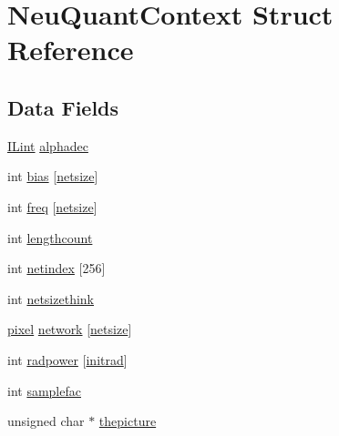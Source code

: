 \hypertarget{struct_neu_quant_context}{\section{Neu\-Quant\-Context Struct Reference}
\label{struct_neu_quant_context}
}
\subsection*{Data Fields}
\begin{DoxyCompactItemize}
\item 
\hyperlink{il_8h_a288a97fb9e92e707a60b749d0039fafe}{I\-Lint} \hyperlink{struct_neu_quant_context_a101a77f74a691b7f95879ab9dfd05595}{alphadec}
\item 
int \hyperlink{struct_neu_quant_context_a5cab766b9d5a7ed49be630484950ccb6}{bias} \mbox{[}\hyperlink{il__neuquant_8c_ae651ff1a07d9fb1d49074e40d7568e80}{netsize}\mbox{]}
\item 
int \hyperlink{struct_neu_quant_context_a044c33df77c6ee661052c46be72946aa}{freq} \mbox{[}\hyperlink{il__neuquant_8c_ae651ff1a07d9fb1d49074e40d7568e80}{netsize}\mbox{]}
\item 
int \hyperlink{struct_neu_quant_context_a4fccc1230885af77de82fb5d542a2083}{lengthcount}
\item 
int \hyperlink{struct_neu_quant_context_a67cbe5bb75fbeda954a61fd279a40290}{netindex} \mbox{[}256\mbox{]}
\item 
int \hyperlink{struct_neu_quant_context_a429f52e6db73a15cc4069ef19991b3ed}{netsizethink}
\item 
\hyperlink{il__neuquant_8c_aca0bff8bcf6a7338356c446b77c5acbb}{pixel} \hyperlink{struct_neu_quant_context_a768cbb071f6cea3209dec82d83a6c778}{network} \mbox{[}\hyperlink{il__neuquant_8c_ae651ff1a07d9fb1d49074e40d7568e80}{netsize}\mbox{]}
\item 
int \hyperlink{struct_neu_quant_context_a42a9c620b479a5b886aaf95eec777034}{radpower} \mbox{[}\hyperlink{il__neuquant_8c_aa2b20fb42cab7e9f11a80c702af1cf49}{initrad}\mbox{]}
\item 
int \hyperlink{struct_neu_quant_context_a0d29df21d00b35c6932561829da64539}{samplefac}
\item 
unsigned char $\ast$ \hyperlink{struct_neu_quant_context_a7e641cb171baef8ef62a1504abc73f0b}{thepicture}
\end{DoxyCompactItemize}


